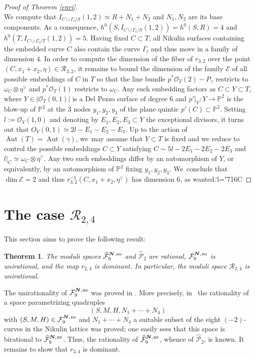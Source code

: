 \documentclass[JEP,XML,SOM,Unicode,NoEqCountersInSection,published]{cedram}
\newcommand{\Changelback}{\mathcode`l="716C}
\newcommand{\ns}{{\mkern1mu\mathrm{ns}}}
\newcommand{\bN}{\boldsymbol{N}}
\theoremstyle{plain}
\newtheorem{thm}{Theorem}[section]
\theoremstyle{definition}
\DeclareMathOperator{\Aut}{Aut}
\newcommand\PP{{\mathbb P}}
\newcommand\E{{\mathcal E}}
\newcommand\F{{\mathcal F}}
\renewcommand\O{{\mathcal O}}
\renewcommand\P{{\mathcal P}}
\newcommand\R{{\mathcal R}}
\begin{document}
\begin{proof}[Proof of Theorem \ref{enri}]
\[\]
We compute that $I_{C\cup \Gamma_l/S}(1,2)\simeq R+N_1+N_2$ and $N_1,N_2$ are its base components. As a consequence, $h^0(S, I_{C\cup \Gamma_l/S}(1,2))=h^0(S,R)=4$ and $h^0(T, I_{C\cup \Gamma_l/T}(1,2))=5$. Having fixed $C\subset T$, all Nikulin surfaces containing the embedded curve $C$ also contain the curve $\Gamma_l$ and thus move in a family of dimension $4$. In order to compute the dimension of the fiber of $r_{3,2}$ over the point $(C,x_1+x_2,\eta)\in \R_{3,2}$, it remains to bound the dimension of the family $\E$ of all possible embeddings of $C$ in $T$ so that the line bundle $p^*\O_T(2)-P_\gamma$ restricts to $\omega_C\otimes \eta^\vee$ and $p^*\O_T(1)$ restricts to $\omega_C$. Any such embedding factors as $C\subset Y\subset T$, where $Y\in |\O_T(0,1)|$ is a Del Pezzo surface of degree $6$ and $p'|_Y:Y\to \PP^2$ is the blow-up of $\PP^2$ at the $3$ nodes $y_1,y_2,y_3$ of the plane quintic $p'(C)\subset \PP^2$. Setting $l:=\O_Y(1,0)$ and denoting by $E_1,E_2,E_3\subset Y$ the exceptional divisors, it turns out that $O_Y(0,1)\simeq 2l-E_1-E_2-E_3$. Up to the action of $\Aut(T)=\Aut(\gamma)$, we~may assume that $Y\subset T$ is fixed and we reduce to control the possible embeddings $C\subset Y$ satisfying $C\sim 5l-2E_1-2E_2-2E_3$ and $l|_C\simeq \omega_C\otimes \eta^\vee$. Any two such embeddings differ by an automorphism of $Y$, or equivalently, by an automorphism of $\PP^2$ fixing $y_1,y_2,y_3$. We~conclude that $\dim \E=2$ and thus $r_{3,2}^{-1}(C,x_1+x_2,\eta^\vee) $ has dimension $6$, as wanted.\Changelback
\end{proof}

\section{The case \texorpdfstring{$\R_{2,4}$}{R}}

This section aims to prove the following result:

\begin{thm}\label{giorgio}
The moduli spaces $\widehat{\F}_{9}^{\bN,\ns}$ and $\widehat\P_{2}$ are rational,
$\F_{9}^{\bN,\ns}$ is unirational, and
the map $r_{2,4}$ is dominant. In particular, the moduli space $\R_{2,4}$ is unirational.
\end{thm}

The unirationality of $\F_{9}^{\bN,\ns}$ was proved in \cite[Th.\,1.2]{KLV2}. More precisely, in~\cite[Th.\,4.5]{KLV2} the rationality of a space parametrizing quadruples\vspace*{-3pt}\enlargethispage{.5\baselineskip}
\[
(S,M,H,N_1+\cdots +N_4)
\]
with $(S,M,H) \in \F_{9}^{\bN,\ns}$ and $N_1+\cdots+N_4$ a suitable subset of the eight $(-2)$-curves in the Nikulin lattice was proved; one easily sees that this space is birational to $\widehat{\F}_{9}^{\bN,\ns}$. Thus, the rationality of
$\widehat{\F}_{9}^{\bN,\ns}$, whence of $\widehat\P_{2}$, is known. It remains to show that $r_{2,4}$ is dominant.
\end{document}
